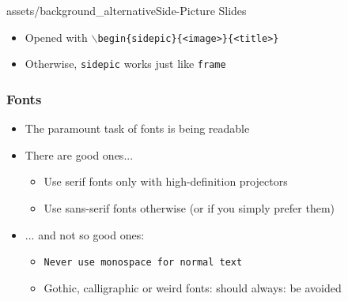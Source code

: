 
\begin{sidepic}{assets/background_alternative}{Side-Picture Slides}
\begin{itemize}
    \item Opened with \texttt{$\backslash$begin\{sidepic\}\{<image>\}\{<title>\}}
    \item Otherwise, \texttt{sidepic} works just like \texttt{frame}
\end{itemize}
\end{sidepic}


\begin{frame}
\frametitle{Fonts}
\begin{itemize}
    \item The paramount task of fonts is being readable
    \item There are good ones...
      \begin{itemize}
          \item {\textrm{Use serif fonts only with high-definition projectors}}
          \item {\textsf{Use sans-serif fonts otherwise (or if you simply prefer them)}}
      \end{itemize}
    \item ... and not so good ones:
    \begin{itemize}
        \item {\texttt{Never use monospace for normal text}}
        \item {\frakfamily Gothic, calligraphic or weird fonts: should always: be avoided}
\end{itemize}
\end{itemize}
\end{frame}


